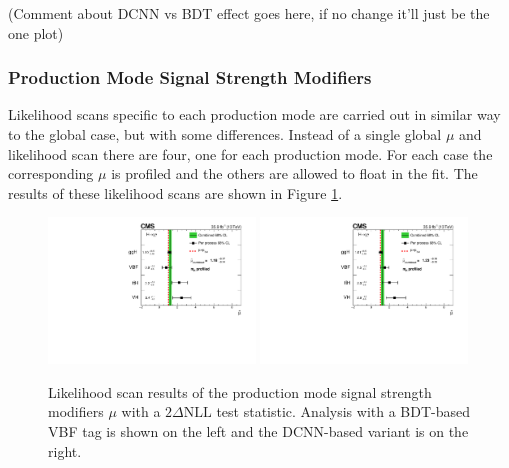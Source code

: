 (Comment about DCNN vs BDT effect goes here, if no change it'll just be the one plot)














\subsubsection{Production Mode Signal Strength Modifiers}
Likelihood scans specific to each production mode are carried out in similar way to the global case, but with some differences. 
Instead of a single global $\mu$ and likelihood scan there are four, one for each production mode. 
For each case the corresponding $\mu$ is profiled and the others are allowed to float in the fit. 
The results of these likelihood scans are shown in Figure \ref{fig:stats_results:prod_mu_scans}. 
\begin{figure}[h!]
    \begin{center}
        \includegraphics[width=0.49\textwidth]{figures/stats_results/CMS-HIG-16-040_Figure_017.pdf}
        \includegraphics[width=0.49\textwidth]{figures/stats_results/PerProcessMuProfileMH.pdf}
    \end{center}
    \caption{Likelihood scan results of the production mode signal strength modifiers $\mu$ with a $2\Delta{\mathrm{NLL}}$ test statistic. Analysis with a BDT-based VBF tag is shown on the left and the DCNN-based variant is on the right.}
        \label{fig:stats_results:prod_mu_scans}
\end{figure}


